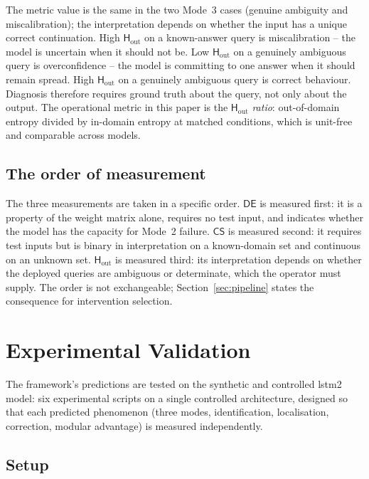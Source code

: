 \documentclass[11pt,a4paper]{article}
\newcommand{\CS}{\mathsf{CS}}
\newcommand{\DE}{\mathsf{DE}}
\newcommand{\Hout}{\mathsf{H}_{\mathrm{out}}}
\begin{document}
The metric value is the same in the two Mode~3 cases (genuine ambiguity and miscalibration); the interpretation depends on whether the input has a unique correct continuation. High $\Hout$ on a known-answer query is miscalibration -- the model is uncertain when it should not be. Low $\Hout$ on a genuinely ambiguous query is overconfidence -- the model is committing to one answer when it should remain spread. High $\Hout$ on a genuinely ambiguous query is correct behaviour. Diagnosis therefore requires ground truth about the query, not only about the output. The operational metric in this paper is the $\Hout$ \emph{ratio}: out-of-domain entropy divided by in-domain entropy at matched conditions, which is unit-free and comparable across models.


\subsection{The order of measurement}
\label{sec:protocol-order}

The three measurements are taken in a specific order. $\DE$ is measured first: it is a property of the weight matrix alone, requires no test input, and indicates whether the model has the capacity for Mode~2 failure. $\CS$ is measured second: it requires test inputs but is binary in interpretation on a known-domain set and continuous on an unknown set. $\Hout$ is measured third: its interpretation depends on whether the deployed queries are ambiguous or determinate, which the operator must supply. The order is not exchangeable; Section~\ref{sec:pipeline} states the consequence for intervention selection.


\section{Experimental Validation}
\label{sec:experiments}

The framework's predictions are tested on the synthetic and controlled lstm2 model: six experimental scripts on a single controlled architecture, designed so that each predicted phenomenon (three modes, identification, localisation, correction, modular advantage) is measured independently.


\subsection{Setup}
\label{sec:exp-setup}
\end{document}
